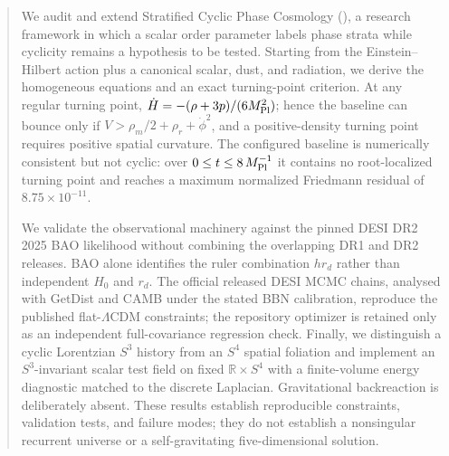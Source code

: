 \begin{abstract}
We audit and extend Stratified Cyclic Phase Cosmology (\SCPC), a research framework in which a scalar order parameter labels phase strata while cyclicity remains a hypothesis to be tested. Starting from the Einstein--Hilbert action plus a canonical scalar, dust, and radiation, we derive the homogeneous equations and an exact turning-point criterion. At any regular turning point,
$\dot H=-(\rho+3p)/(6\Mpl^2)$; hence the baseline can bounce only if
$V>\rho_m/2+\rho_r+\dot\phi^2$, and a positive-density turning point requires positive spatial curvature. The configured baseline is numerically consistent but not cyclic: over $0\le t\le8\,\Mpl^{-1}$ it contains no root-localized turning point and reaches a maximum normalized Friedmann residual of $8.75\times10^{-11}$.

We validate the observational machinery against the pinned DESI DR2 2025 BAO likelihood without combining the overlapping DR1 and DR2 releases. BAO alone identifies the ruler combination $h r_d$ rather than independent $H_0$ and $r_d$. The official released DESI MCMC chains, analysed with GetDist and CAMB under the stated BBN calibration, reproduce the published flat-$\Lambda$CDM constraints; the repository optimizer is retained only as an independent full-covariance regression check. Finally, we distinguish a cyclic Lorentzian $S^3$ history from an $S^4$ spatial foliation and implement an $S^3$-invariant scalar test field on fixed $\mathbb R\times S^4$ with a finite-volume energy diagnostic matched to the discrete Laplacian. Gravitational backreaction is deliberately absent. These results establish reproducible constraints, validation tests, and failure modes; they do not establish a nonsingular recurrent universe or a self-gravitating five-dimensional solution.
\end{abstract}
